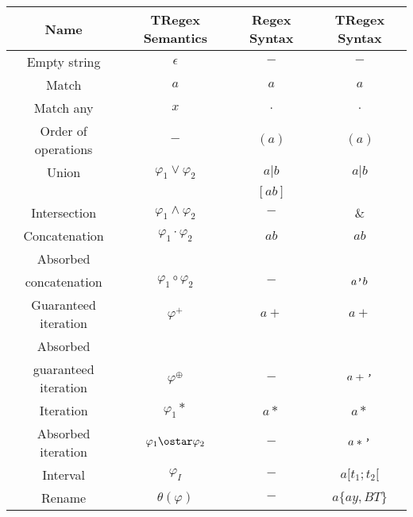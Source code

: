 \begin{tabular}{ |c|c|c|c| }
    \hline
    \textbf{Name} & \textbf{TRegex Semantics} & \textbf{Regex Syntax} & \textbf{TRegex Syntax} \\
    \hline
    Empty string & $\epsilon$ & $-$ & $-$ \\
    \hline
    Match & $a$ & $a$ & $a$ \\
    \hline
    Match any & $x$ & $.$ & $.$ \\
    \hline
    Order of operations & $-$ & $(a)$ & $(a)$ \\
    \hline
    Union & $\varphi_1\vee\varphi_2$ & $a|b$ & $a|b$ \\
    & & $[ab]$ &  \\
    \hline
    Intersection & $\varphi_1\wedge\varphi_2$ & $-$ & $\&$ \\
    \hline
    Concatenation & $\varphi_1\cdot\varphi_2$ & $ab$ & $ab$ \\
    \hline
    Absorbed & & & \\
    concatenation & $\varphi_1\circ\varphi_2$ & $-$ & $a\verb|'|b$ \\
    \hline
    Guaranteed iteration & $\varphi^+$ & $a+$ & $a+$ \\
    \hline
    Absorbed & & & \\
    guaranteed iteration & $\varphi^\oplus$ & $-$ & $a+\verb|'|$ \\
    \hline
    Iteration & $\varphi_1*$ & $a*$ & $a*$ \\
    \hline
    Absorbed iteration & $\varphi_1\ostar\varphi_2$ & $-$ & $a*\verb|'|$ \\
    \hline
    Interval & $\varphi_I$ & $-$ & $a[t_1;t_2[$ \\
    \hline
    Rename & $\theta(\varphi)$ & $-$ & $a\{ay,BT\}$ \\
    \hline
\end{tabular}
\cite*{Eugene2001}\cite*{Masaki2018}